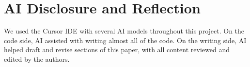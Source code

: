 \documentclass[11pt]{article}
\begin{document}
\section{AI Disclosure and Reflection}
\label{sec:ai_disclosure}

We used the Cursor IDE with several AI models throughout this project. On the code side, AI assisted with writing almost all of the code. On the writing side, AI helped draft and revise sections of this paper, with all content reviewed and edited by the authors.


\end{document}
